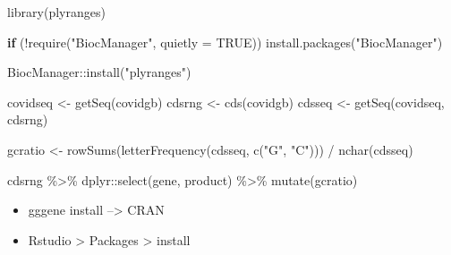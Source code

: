 \documentclass[
]{book}
\newenvironment{Shaded}{\begin{snugshade}}{\end{snugshade}}
\newcommand{\AttributeTok}[1]{\textcolor[rgb]{0.77,0.63,0.00}{#1}}
\newcommand{\ConstantTok}[1]{\textcolor[rgb]{0.00,0.00,0.00}{#1}}
\newcommand{\ControlFlowTok}[1]{\textcolor[rgb]{0.13,0.29,0.53}{\textbf{#1}}}
\newcommand{\FunctionTok}[1]{\textcolor[rgb]{0.00,0.00,0.00}{#1}}
\newcommand{\NormalTok}[1]{#1}
\newcommand{\OtherTok}[1]{\textcolor[rgb]{0.56,0.35,0.01}{#1}}
\newcommand{\SpecialCharTok}[1]{\textcolor[rgb]{0.00,0.00,0.00}{#1}}
\newcommand{\StringTok}[1]{\textcolor[rgb]{0.31,0.60,0.02}{#1}}
\providecommand{\tightlist}{%
  \setlength{\itemsep}{0pt}\setlength{\parskip}{0pt}}
\begin{document}
\begin{Shaded}
\begin{Highlighting}[]
\FunctionTok{library}\NormalTok{(plyranges)}

\ControlFlowTok{if}\NormalTok{ (}\SpecialCharTok{!}\FunctionTok{require}\NormalTok{(}\StringTok{"BiocManager"}\NormalTok{, }\AttributeTok{quietly =} \ConstantTok{TRUE}\NormalTok{))}
    \FunctionTok{install.packages}\NormalTok{(}\StringTok{"BiocManager"}\NormalTok{)}

\NormalTok{BiocManager}\SpecialCharTok{::}\FunctionTok{install}\NormalTok{(}\StringTok{"plyranges"}\NormalTok{)}

\NormalTok{covidseq }\OtherTok{\textless{}{-}} \FunctionTok{getSeq}\NormalTok{(covidgb)}
\NormalTok{cdsrng }\OtherTok{\textless{}{-}} \FunctionTok{cds}\NormalTok{(covidgb)}
\NormalTok{cdsseq }\OtherTok{\textless{}{-}} \FunctionTok{getSeq}\NormalTok{(covidseq, cdsrng)}

\NormalTok{gcratio }\OtherTok{\textless{}{-}} \FunctionTok{rowSums}\NormalTok{(}\FunctionTok{letterFrequency}\NormalTok{(cdsseq, }\FunctionTok{c}\NormalTok{(}\StringTok{"G"}\NormalTok{, }\StringTok{"C"}\NormalTok{))) }\SpecialCharTok{/} \FunctionTok{nchar}\NormalTok{(cdsseq)}

\NormalTok{cdsrng }\SpecialCharTok{\%\textgreater{}\%} 
\NormalTok{  dplyr}\SpecialCharTok{::}\FunctionTok{select}\NormalTok{(gene, product) }\SpecialCharTok{\%\textgreater{}\%} 
  \FunctionTok{mutate}\NormalTok{(gcratio)}
  
\end{Highlighting}
\end{Shaded}

\begin{itemize}
\tightlist
\item
  gggene install --\textgreater{} CRAN
\item
  Rstudio \textgreater{} Packages \textgreater{} install
\end{itemize}
\end{document}

